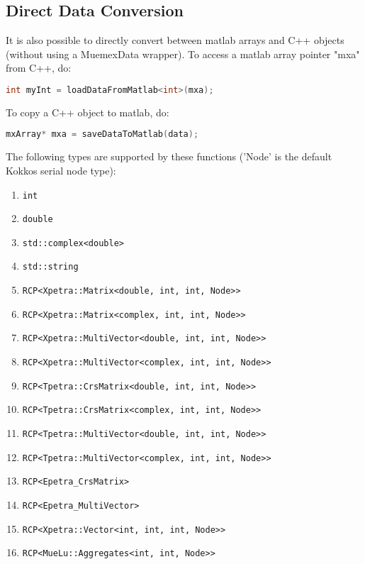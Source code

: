 \subsection{Direct Data Conversion}

It is also possible to directly convert between matlab arrays and C++ objects (without using a MuemexData wrapper).
To access a matlab array pointer "mxa" from C++, do:

\begin{lstlisting}[language=C++]
   int myInt = loadDataFromMatlab<int>(mxa);
\end{lstlisting}

To copy a C++ object to matlab, do:

\begin{lstlisting}[language=C++]
   mxArray* mxa = saveDataToMatlab(data);
\end{lstlisting}

The following types are supported by these functions ('Node' is the default Kokkos serial node type):

\begin{enumerate}
  \item {\tt int}
  \item {\tt double}
  \item {\tt std::complex<double>}
  \item {\tt std::string}
  \item {\tt RCP<Xpetra::Matrix<double, int, int, Node>>}
  \item {\tt RCP<Xpetra::Matrix<complex, int, int, Node>>}
  \item {\tt RCP<Xpetra::MultiVector<double, int, int, Node>>}
  \item {\tt RCP<Xpetra::MultiVector<complex, int, int, Node>>}
  \item {\tt RCP<Tpetra::CrsMatrix<double, int, int, Node>>}
  \item {\tt RCP<Tpetra::CrsMatrix<complex, int, int, Node>>}
  \item {\tt RCP<Tpetra::MultiVector<double, int, int, Node>>}
  \item {\tt RCP<Tpetra::MultiVector<complex, int, int, Node>>}
  \item {\tt RCP<Epetra\_CrsMatrix>}
  \item {\tt RCP<Epetra\_MultiVector>}
  \item {\tt RCP<Xpetra::Vector<int, int, int, Node>>}
  \item {\tt RCP<MueLu::Aggregates<int, int, Node>>}
\end{enumerate}

